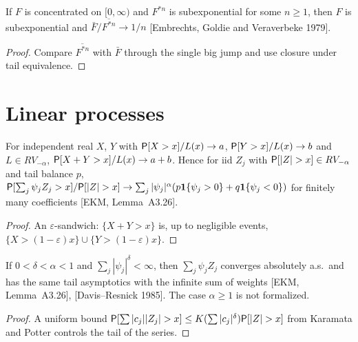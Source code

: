 \begin{theorem}
  \label{thm:conv-roots}
  \leanok
  If $F$ is concentrated on $[0, \infty)$ and $F^{*n}$ is subexponential for some $n \ge 1$, then
  $F$ is subexponential and $\bar F / \overline{F^{*n}} \to 1/n$
  [Embrechts, Goldie and Veraverbeke 1979].
\end{theorem}
\begin{proof}
  \leanok
  Compare $\overline{F^{*n}}$ with $\bar F$ through the single big jump and use
  closure under tail equivalence.
\end{proof}

\section{Linear processes}

\begin{theorem}
  \label{thm:linear-tails}
  \leanok
  For independent real $X$, $Y$ with $\mathsf{P}[X > x]/L(x) \to a$, $\mathsf{P}[Y > x]/L(x) \to b$ and $L \in RV_{-\alpha}$,
  $\mathsf{P}[X + Y > x]/L(x) \to a + b$. Hence for iid $Z_j$ with $\mathsf{P}[|Z| > x] \in RV_{-\alpha}$ and tail balance
  $p$, $\mathsf{P}[\sum_j \psi_j Z_j > x]/\mathsf{P}[|Z| > x] \to \sum_j |\psi_j|^\alpha (p \mathbf 1\{\psi_j > 0\} + q
  \mathbf 1\{\psi_j < 0\})$ for finitely many coefficients [EKM, Lemma~A3.26].
\end{theorem}
\begin{proof}
  \leanok
  An $\varepsilon$-sandwich: $\{X + Y > x\}$ is, up to negligible events, $\{X > (1-\varepsilon)x\} \cup
  \{Y > (1-\varepsilon)x\}$.
\end{proof}

\begin{theorem}
  \label{thm:linear-tails-infinite}
  \leanok
  If $0 < \delta < \alpha < 1$ and $\sum_j |\psi_j|^\delta < \infty$, then $\sum_j \psi_j Z_j$ converges
  absolutely a.s.\ and has the same tail asymptotics with the infinite sum of weights
  [EKM, Lemma~A3.26], [Davis--Resnick 1985]. The case $\alpha \ge 1$ is not formalized.
\end{theorem}
\begin{proof}
  \leanok
  A uniform bound $\mathsf{P}[\sum |c_j||Z_j| > x] \le K (\sum |c_j|^\delta) \mathsf{P}[|Z| > x]$ from Karamata and Potter
  controls the tail of the series.
\end{proof}

